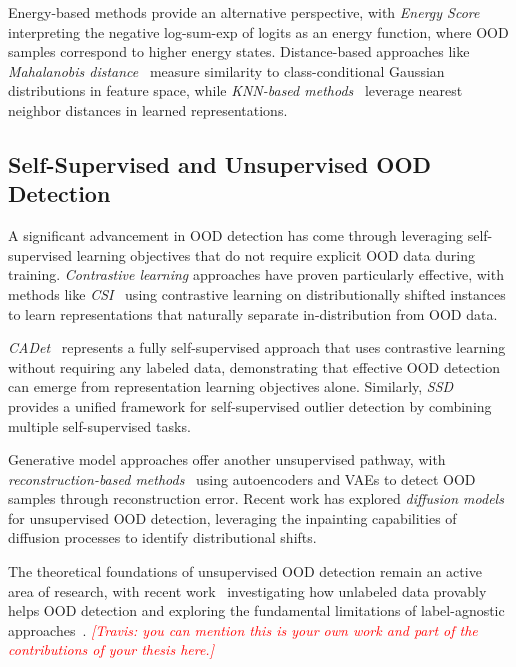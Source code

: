 \documentclass[11pt, oneside]{book}
\theoremstyle{plain}
\theoremstyle{definition}
\theoremstyle{remark}
\newcommand{\travis}[1]{\textcolor{red}{{\it [Travis: #1]}}}
\begin{document}
Energy-based methods provide an alternative perspective, with \emph{Energy Score}~\citep{liu2020energy} interpreting the negative log-sum-exp of logits as an energy function, where OOD samples correspond to higher energy states. Distance-based approaches like \emph{Mahalanobis distance}~\citep{lee2018simple} measure similarity to class-conditional Gaussian distributions in feature space, while \emph{KNN-based methods}~\citep{sun2022out} leverage nearest neighbor distances in learned representations.

\subsection{Self-Supervised and Unsupervised OOD Detection}

A significant advancement in OOD detection has come through leveraging self-supervised learning objectives that do not require explicit OOD data during training. \emph{Contrastive learning} approaches have proven particularly effective, with methods like \emph{CSI}~\citep{tack2020csi} using contrastive learning on distributionally shifted instances to learn representations that naturally separate in-distribution from OOD data.

\emph{CADet}~\citep{guille2024cadet} represents a fully self-supervised approach that uses contrastive learning without requiring any labeled data, demonstrating that effective OOD detection can emerge from representation learning objectives alone. Similarly, \emph{SSD}~\citep{sehwag2021ssd} provides a unified framework for self-supervised outlier detection by combining multiple self-supervised tasks.

Generative model approaches offer another unsupervised pathway, with \emph{reconstruction-based methods}~\citep{zhou2022rethinking} using autoencoders and VAEs to detect OOD samples through reconstruction error. Recent work has explored \emph{diffusion models}~\citep{liu2023unsupervised} for unsupervised OOD detection, leveraging the inpainting capabilities of diffusion processes to identify distributional shifts.

The theoretical foundations of unsupervised OOD detection remain an active area of research, with recent work~\citep{du2024does} investigating how unlabeled data provably helps OOD detection and exploring the fundamental limitations of label-agnostic approaches~\citep{yangcan}. \travis{you can mention this is your own work and part of the contributions of your thesis here.}
\end{document}
